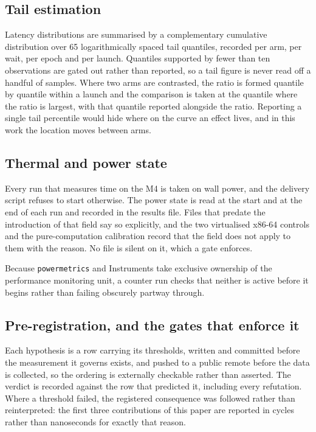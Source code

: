 \documentclass[conference]{IEEEtran}
\begin{document}
\subsection{Tail estimation}

Latency distributions are summarised by a complementary cumulative distribution
over 65 logarithmically spaced tail quantiles, recorded per arm, per wait, per
epoch and per launch. Quantiles supported by fewer than ten observations are
gated out rather than reported, so a tail figure is never read off a handful of
samples. Where two arms are contrasted, the ratio is formed quantile by quantile
within a launch and the comparison is taken at the quantile where the ratio is
largest, with that quantile reported alongside the ratio. Reporting a single
tail percentile would hide where on the curve an effect lives, and in this work
the location moves between arms.

\subsection{Thermal and power state}

Every run that measures time on the M4 is taken on wall power, and the delivery
script refuses to start otherwise. The power state is read at the start and at
the end of each run and recorded in the results file. Files that predate the
introduction of that field say so explicitly, and the two virtualised x86-64
controls and the pure-computation calibration record that the field does not
apply to them with the reason. No file is silent on it, which a gate enforces.

Because \texttt{powermetrics} and Instruments take exclusive ownership of the
performance monitoring unit, a counter run checks that neither is active before
it begins rather than failing obscurely partway through.

\subsection{Pre-registration, and the gates that enforce it}
\label{sec:gates}

Each hypothesis is a row carrying its thresholds, written and committed before
the measurement it governs exists, and pushed to a public remote before the data
is collected, so the ordering is externally checkable rather than asserted. The
verdict is recorded against the row that predicted it, including every
refutation. Where a threshold failed, the registered consequence was followed
rather than reinterpreted: the first three contributions of this paper are
reported in cycles rather than nanoseconds for exactly that reason.
\end{document}
